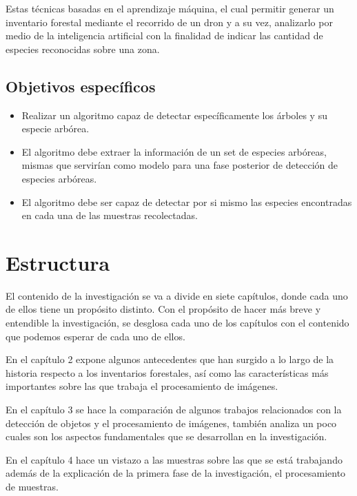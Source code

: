 Estas técnicas  basadas en el aprendizaje máquina, el cual permitir
generar un inventario forestal mediante el recorrido de un dron y a su vez, analizarlo por medio de la inteligencia artificial con la finalidad de indicar las cantidad de especies reconocidas sobre una zona.

\subsection{Objetivos específicos}
\begin{itemize}
\item Realizar un algoritmo capaz de detectar específicamente los árboles y su especie arbórea.
\end{itemize}

\begin{itemize}
\item El algoritmo debe extraer la información de un set de especies arbóreas, mismas que servirían como modelo para una fase posterior de detección de especies arbóreas.
\end{itemize}

\begin{itemize}
\item El algoritmo debe ser capaz de detectar por si mismo las especies encontradas en cada una de las muestras recolectadas.
\end{itemize}

\pagebreak

\section{Estructura}
El contenido de la investigación se va a divide en siete capítulos, donde cada uno de ellos tiene un propósito distinto. Con el propósito de hacer más breve y entendible la investigación, se desglosa cada uno de los capítulos con el contenido que podemos esperar de cada uno de ellos.

En el capítulo 2 expone algunos antecedentes que han surgido a lo largo
de la historia respecto a los inventarios forestales, así como las características más importantes sobre las que trabaja el procesamiento de imágenes.

En el capítulo 3 se hace la comparación de algunos trabajos relacionados con la detección de objetos y el procesamiento de imágenes, también analiza un poco cuales son los aspectos fundamentales que se desarrollan en la investigación.

En el capítulo 4 hace un vistazo a las muestras sobre las que se está trabajando además de la explicación de la primera fase de la investigación, el procesamiento de muestras.

